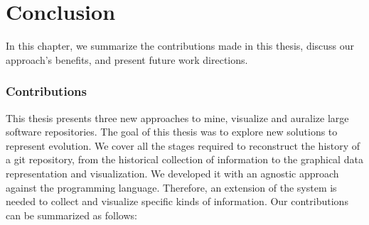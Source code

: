 \chapter{Conclusion}
In this chapter, we summarize the contributions made in this thesis, discuss our approach's benefits, and present future work directions.

\subsection*{Contributions}
This thesis presents three new approaches to mine, visualize and auralize large software repositories. The goal of this thesis was to explore new solutions to represent evolution. We cover all the stages required to reconstruct the history of a git repository, from the historical collection of information to the graphical data representation and visualization. We developed it with an agnostic approach against the programming language. Therefore, an extension of the system is needed to collect and visualize specific kinds of information. Our contributions can be summarized as follows:
